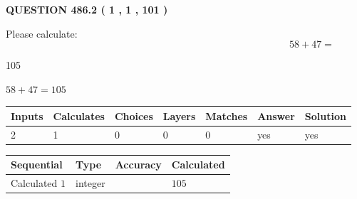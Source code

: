 \documentclass[12pt]{article}
\begin{document}
   
  
\vspace{0.2in}
  
{\textbf{\Large{QUESTION
486.2 
 ( 1 , 1 , 101 )
}}}
  
  
 
Please calculate:
\begin{equation}
58 +  %
47 = \nonumber
\end{equation}
 
 
 
\noindent{}
 
 

105
 
 
\noindent{}
 
 

 
 
 
\noindent{}
 
 

$ %
58 +  %
47=   %
105$
 
 
\noindent{}
 
 

 
   
   
   
   
\noindent\begin{tabular}{|l|l|l|l|l|l|l|}
 \hline
Inputs & Calculates & Choices & Layers & Matches & Answer & Solution \\ \hline
 2  & 
 1  & 
 0
  & 
 0  & 
 0  & 
  yes & 
  yes 
  \\ \hline
 \end{tabular}
   
   
   
   
\noindent{}
   
   
  
  
\noindent\begin{tabular}{|l|l|l|l|}
\hline
 Sequential & Type & Accuracy & Calculated \\ 
\hline
 
 
  Calculated $  1 $ & integer &  & 
  $ 105 $ 
 \\  \hline  
 \end{tabular}
   
\end{document}
